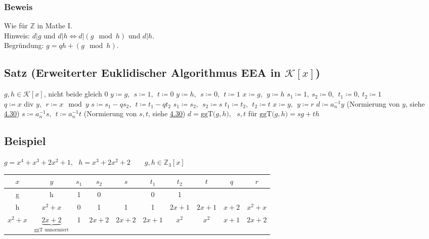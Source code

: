\documentclass[a4paper, 12pt,titlepage, pdf, headsepline]{article}
\newcommand{\Z}{\mathds{Z}}
\newcommand{\K}{\mathcal{K}}
\newcommand{\ggT}[1]{\textrm{ggT($#1$)}}
\renewcommand{\div}{\textrm{  div }}
\renewcommand{\>}{\rightarrow}
\renewcommand{\*}{\cdot}
\begin{document}
		      	\subsubsection*{Beweis}
		      	Wie für $\Z$ in Mathe I.\\
		      	Hinweis: $d\vert g$ und $d\vert h\Leftrightarrow d\vert (g\mod h)$ und $d\vert h$.\\
		      	Begründung: $g=qh+(g\mod h)$.
		      	\subsection{Satz (Erweiterter Euklidischer Algorithmus EEA  in $\K[x]$)}
		      	\label{4.33}
		      	\begin{algorithmic}[1]
		      		\algrenewcommand{}
		      		\algrenewcommand{}
		      		\Statex
		      		\Require $g,h\in \K[x]$, nicht beide gleich 0
		      		\State $y\coloneqq g,~~s\coloneqq 1,~~t\coloneqq0$
		      		\EndIf
		      		\State $y\coloneqq h,~~s\coloneqq 0,~~t\coloneqq1$
		      		\EndIf
		      		\State $x\coloneqq g,~~y\coloneqq h$
		      		\State $s_1\coloneqq 1,~s_2\coloneqq 0,~~t_1\coloneqq 0,~t_2\coloneqq 1$
		      		\State $q\coloneqq x\div y,~~r\coloneqq x\mod y$
		      		\State $s\coloneqq s_1-qs_2,~~t\coloneqq t_1-qt_2$
		      		\State $s_1\coloneqq s_2,~~s_2\coloneqq s$
		      		\State $t_1\coloneqq t_2,~~t_2\coloneqq t$
		      		\State $x\coloneqq y,~~y\coloneqq r$
		      		\EndWhile
		      		\EndIf
		      		\State $d\coloneqq a^{-1}_ny$ (Normierung von $y$, siehe \hyperref[4.30]{4.30})
		      		\State $s\coloneqq a^{-1}_ns,~~t\coloneqq a^{-1}_nt$ (Normierung von $s,t$, siehe \hyperref[4.30]{4.30})
		      		\Ensure $d=\ggT{g,h},~~~s,t$ für $\ggT{g,h}=sg+th$
		      	\end{algorithmic}
		      	\subsection{Beispiel}
		      	$g = x^4 + x^3 + 2x^2 +1,~~~ h = x^3 + 2x^2 + 2\qquad  g,h \in \mathds{Z}_3[x]$\\			
		      	\begin{tabular}{c | c | c | c | c | c | c | c | c | c }
		      		$x$      & $y$                                           & $s_1$ & $s_2$  & $s$    & $t_1$  & $t_2$  & $t$    & $q$   & $r$      \\ \hline
		      		g        & h                                             & 1     & 0      &        & 0      & 1      &        &       &          \\ 
		      		h        & $x^2 +x$                                      & 0     & 1      & 1      & 1      & $2x+1$ & $2x+1$ & $x+2$ & $x^2 +x$ \\
		      		$x^2 +x$ & $\underbrace{2x+2}_{\textrm{ggT unnormiert}}$ & 1     & $2x+2$ & $2x+2$ & $2x+1$ & $x^2$  & $x^2$  & $x+1$ & $2x +2$  \\
		      	\end{tabular} \\	
\end{document}
